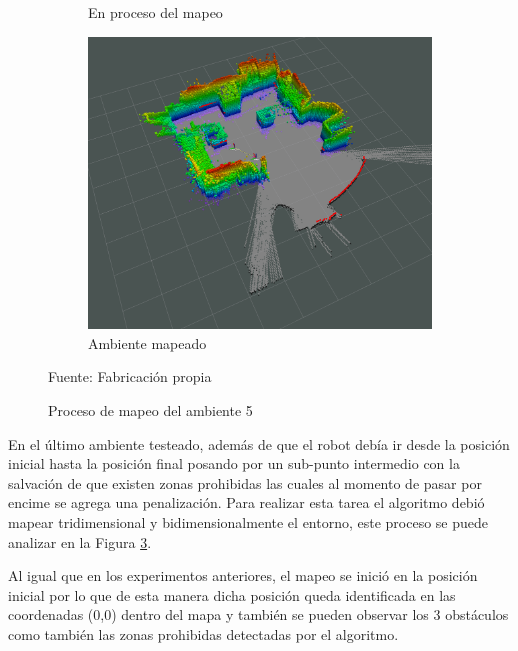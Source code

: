 \begin{figure}[H]
\begin{subfigure}[b]{0.30\textwidth}
    \caption{En proceso del mapeo}
    \label{fig:ambiente_5_2}
    \end{subfigure}
    \begin{subfigure}[b]{0.30\textwidth}
    \includegraphics[width=\textwidth, height=\textwidth]{figures/05experimentacion/ambiente_5/r04_03.png}
    \caption{Ambiente mapeado}
    \label{fig:ambiente_5_3}
    \end{subfigure}
    \caption{Proceso de mapeo del ambiente 5}
    Fuente: Fabricación propia
    \label{fig:ambiente_5}
\end{figure} 

En el último ambiente testeado, además de que el robot debía ir desde la posición inicial hasta la posición final posando por un sub-punto intermedio con la salvación de que existen zonas prohibidas las cuales al momento de pasar por encime se agrega una penalización. Para realizar esta tarea el algoritmo debió mapear tridimensional y bidimensionalmente el entorno, este proceso se puede analizar en la Figura \ref{fig:ambiente_5}.

Al igual que en los experimentos anteriores,  el mapeo se inició en la posición inicial por lo que de esta manera dicha posición queda identificada en las coordenadas (0,0) dentro del mapa y también se pueden observar los 3 obstáculos como también las zonas prohibidas detectadas por el algoritmo.

